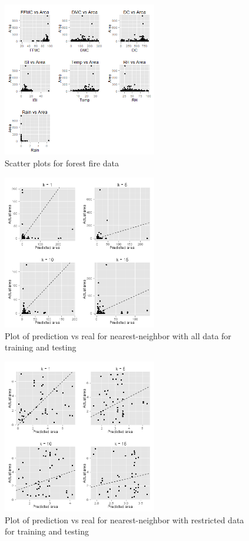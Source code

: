 \documentclass{article}
\begin{document}
\begin{figure}[h]
  \centering
  \includegraphics[width=0.6\textwidth]{figures/forestfire.png}
  \caption{Scatter plots for forest fire data}
  \label{fig:fire_scatters}
\end{figure}
\newpage

\begin{figure}
  \centering
  \includegraphics[width=0.6\textwidth]{figures/knn_good_whole.png}
  \caption{Plot of prediction vs real for nearest-neighbor with all data for
  training and testing}
  \label{fig:knn_whole}
\end{figure}

\begin{figure}
  \centering
  \includegraphics[width=0.6\textwidth]{figures/knn_good_own.png}
  \caption{Plot of prediction vs real for nearest-neighbor with restricted data
    for training and testing}
  \label{fig:knn_own}
\end{figure}
\end{document}

